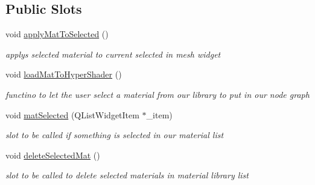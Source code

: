 \subsection*{Public Slots}
\begin{DoxyCompactItemize}
\item 
\hypertarget{class_material_library_a25fbe1df01423d3c29f17b068c1fa93e}{void \hyperlink{class_material_library_a25fbe1df01423d3c29f17b068c1fa93e}{apply\-Mat\-To\-Selected} ()}\label{class_material_library_a25fbe1df01423d3c29f17b068c1fa93e}

\begin{DoxyCompactList}\small\item\em applys selected material to current selected in mesh widget \end{DoxyCompactList}\item 
\hypertarget{class_material_library_a0757b6c745d5796b30abcdb042ba1273}{void \hyperlink{class_material_library_a0757b6c745d5796b30abcdb042ba1273}{load\-Mat\-To\-Hyper\-Shader} ()}\label{class_material_library_a0757b6c745d5796b30abcdb042ba1273}

\begin{DoxyCompactList}\small\item\em functino to let the user select a material from our library to put in our node graph \end{DoxyCompactList}\item 
void \hyperlink{class_material_library_a2e77c2e90d100dec3a113c2ea1e94fb5}{mat\-Selected} (Q\-List\-Widget\-Item $\ast$\-\_\-item)
\begin{DoxyCompactList}\small\item\em slot to be called if something is selected in our material list \end{DoxyCompactList}\item 
\hypertarget{class_material_library_abc3c89c6bbf434a2ea9d21e70198f2ae}{void \hyperlink{class_material_library_abc3c89c6bbf434a2ea9d21e70198f2ae}{delete\-Selected\-Mat} ()}\label{class_material_library_abc3c89c6bbf434a2ea9d21e70198f2ae}

\begin{DoxyCompactList}\small\item\em slot to be called to delete selected materials in material library list \end{DoxyCompactList}\end{DoxyCompactItemize}
